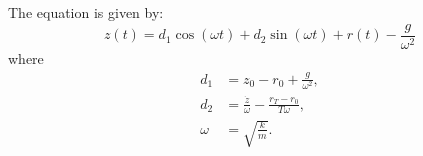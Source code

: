\documentclass{article}
\begin{document}
The equation is given by:
\begin{equation}
    z(t) = d_1 \cos(\omega t) + d_2 \sin(\omega t) + r(t) - \frac{g}{\omega^2}
\end{equation}
where
\begin{align*}
    d_1 &= z_0 - r_0 + \frac{g}{\omega^2}, \\
    d_2 &= \frac{\dot{z}}{\omega} - \frac{r_T - r_0}{T \omega}, \\
    \omega &= \sqrt{\frac{k}{m}}.
\end{align*}
\end{document}
